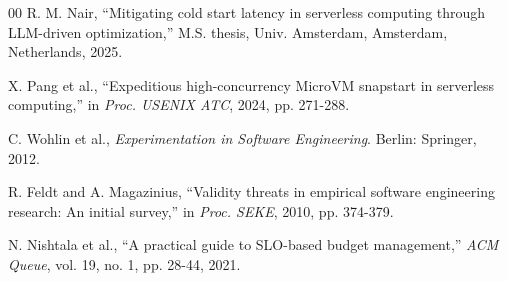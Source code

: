 \documentclass[conference]{IEEEtran}
\begin{document}
\begin{thebibliography}{00}
 R. M. Nair, ``Mitigating cold start latency in serverless computing through LLM-driven optimization,'' M.S. thesis, Univ. Amsterdam, Amsterdam, Netherlands, 2025.

 X. Pang et al., ``Expeditious high-concurrency MicroVM snapstart in serverless computing,'' in \textit{Proc. USENIX ATC}, 2024, pp. 271-288.

 C. Wohlin et al., \textit{Experimentation in Software Engineering}. Berlin: Springer, 2012.

 R. Feldt and A. Magazinius, ``Validity threats in empirical software engineering research: An initial survey,'' in \textit{Proc. SEKE}, 2010, pp. 374-379.

 N. Nishtala et al., ``A practical guide to SLO-based budget management,'' \textit{ACM Queue}, vol. 19, no. 1, pp. 28-44, 2021.

\end{thebibliography}
\end{document}
